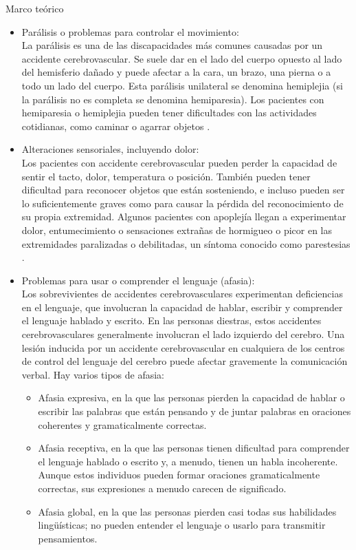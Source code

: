 \begin{thesischapter}{1} {Marco teórico}
    \begin{itemize}
        \item Parálisis o problemas para controlar el movimiento: \\
        La parálisis es una de las discapacidades más comunes causadas por un accidente cerebrovascular. Se suele dar en el lado del cuerpo opuesto al lado del hemisferio dañado y puede afectar a la cara, un brazo, una pierna o a todo un lado del cuerpo. Esta parálisis unilateral se denomina hemiplejia (si la parálisis no es completa se denomina hemiparesia). Los pacientes con hemiparesia o hemiplejia pueden tener dificultades con las actividades cotidianas, como caminar o agarrar objetos \cite{cuidadosalpacienteadulto}.

        \item Alteraciones sensoriales, incluyendo dolor: \\
        Los pacientes con accidente cerebrovascular pueden perder la capacidad de sentir el tacto, dolor, temperatura o posición. También pueden tener dificultad para reconocer objetos que están sosteniendo, e incluso pueden ser lo suficientemente graves como para causar la pérdida del reconocimiento de su propia extremidad. Algunos pacientes con apoplejía llegan a experimentar dolor, entumecimiento o sensaciones extrañas de hormigueo o picor en las extremidades paralizadas o debilitadas, un síntoma conocido como parestesias \cite{post-strok}.
        
        \item Problemas para usar o comprender el lenguaje (afasia): \\
        Los sobrevivientes de accidentes cerebrovasculares experimentan deficiencias en el lenguaje, que involucran la capacidad de hablar, escribir y comprender el lenguaje hablado y escrito. En las personas diestras, estos accidentes cerebrovasculares generalmente involucran el lado izquierdo del cerebro. Una lesión inducida por un accidente cerebrovascular en cualquiera de los centros de control del lenguaje del cerebro puede afectar gravemente la comunicación verbal. Hay varios tipos de afasia:~\cite{post-strok}

        \begin{itemize}
            \item Afasia expresiva, en la que las personas pierden la capacidad de hablar o escribir las palabras que están pensando y de juntar palabras en oraciones coherentes y gramaticalmente correctas.
            \item Afasia receptiva, en la que las personas tienen dificultad para comprender el lenguaje hablado o escrito y, a menudo, tienen un habla incoherente. Aunque estos individuos pueden formar oraciones gramaticalmente correctas, sus expresiones a menudo carecen de significado.
            \item Afasia global, en la que las personas pierden casi todas sus habilidades lingüísticas; no pueden entender el lenguaje o usarlo para transmitir pensamientos.  
        \end{itemize}


\end{itemize}
\end{thesischapter}
